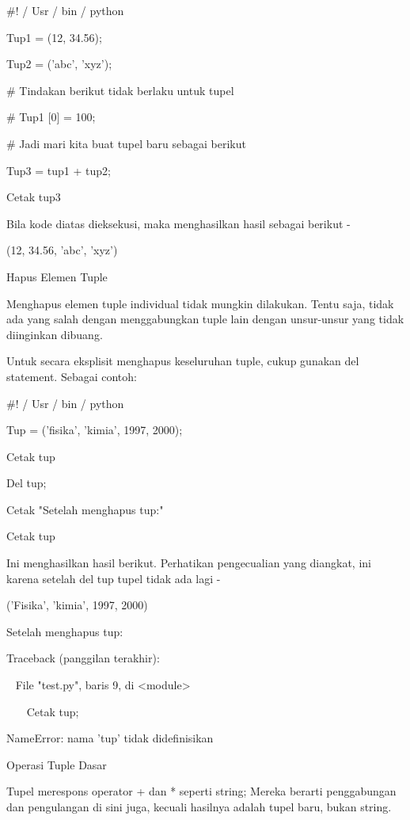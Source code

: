  $  \#  $! / Usr / bin / python \par
\vspace{12pt}
Tup1 = (12, 34.56); \par
Tup2 = ('abc', 'xyz'); \par
\vspace{12pt}
 $  \#  $ Tindakan berikut tidak berlaku untuk tupel \par
 $  \#  $ Tup1 [0] = 100; \par
\vspace{12pt}
 $  \#  $ Jadi mari kita buat tupel baru sebagai berikut \par
Tup3 = tup1 + tup2; \par
Cetak tup3 \par
Bila kode diatas dieksekusi, maka menghasilkan hasil sebagai berikut - \par
(12, 34.56, 'abc', 'xyz') \par
Hapus Elemen Tuple \par
Menghapus elemen tuple individual tidak mungkin dilakukan. Tentu saja, tidak ada yang salah dengan menggabungkan tuple lain dengan unsur-unsur yang tidak diinginkan dibuang. \par
Untuk secara eksplisit menghapus keseluruhan tuple, cukup gunakan del statement. Sebagai contoh: \par
 $  \#  $! / Usr / bin / python \par
\vspace{12pt}
Tup = ('fisika', 'kimia', 1997, 2000); \par
\vspace{12pt}
Cetak tup \par
Del tup; \par
Cetak "Setelah menghapus tup:" \par
Cetak tup \par
Ini menghasilkan hasil berikut. Perhatikan pengecualian yang diangkat, ini karena setelah del tup tupel tidak ada lagi - \par
('Fisika', 'kimia', 1997, 2000) \par
Setelah menghapus tup: \par
Traceback (panggilan terakhir): \par
~ File "test.py", baris 9, di <module> \par
~~~ Cetak tup; \par
NameError: nama 'tup' tidak didefinisikan \par
Operasi Tuple Dasar \par
Tupel merespons operator + dan * seperti string; Mereka berarti penggabungan dan pengulangan di sini juga, kecuali hasilnya adalah tupel baru, bukan string. \par

